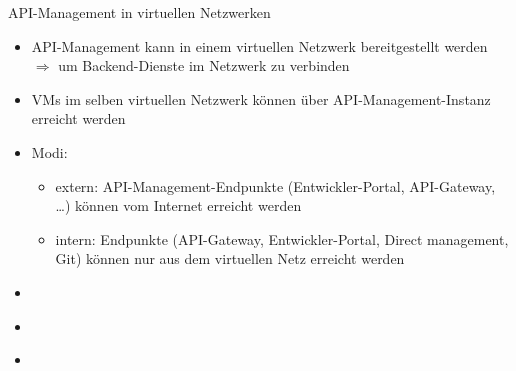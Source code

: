 \begin{flashcard}[]{API-Management in virtuellen Netzwerken}
  \begin{itemize}
    \item API-Management kann in einem virtuellen Netzwerk bereitgestellt werden\newline
      $\Rightarrow$ um Backend-Dienste im Netzwerk zu verbinden
    \item VMs im selben virtuellen Netzwerk können über API-Management-Instanz erreicht werden
    \item Modi:
      \begin{itemize}
        \item extern: API-Management-Endpunkte (Entwickler-Portal, API-Gateway, \ldots) können vom Internet erreicht werden
        \item intern: Endpunkte (API-Gateway, Entwickler-Portal, Direct management, Git) können nur aus dem virtuellen Netz erreicht werden
      \end{itemize}
  \end{itemize}
\end{flashcard}

\begin{flashcard}[]{}
  \begin{itemize}
    \item
  \end{itemize}
\end{flashcard}
\begin{flashcard}[]{}
  \begin{itemize}
    \item
  \end{itemize}
\end{flashcard}
\begin{flashcard}[]{}
  \begin{itemize}
    \item
  \end{itemize}
\end{flashcard}
